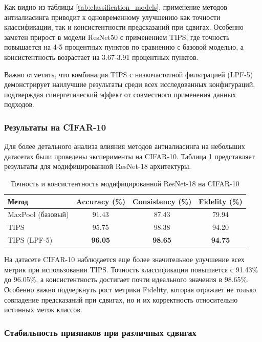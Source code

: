 Как видно из таблицы \ref{tab:classification_models}, применение методов антиалиасинга приводит к одновременному улучшению как точности классификации, так и консистентности предсказаний при сдвигах. Особенно заметен прирост в модели ResNet50 с применением TIPS, где точность повышается на 4-5 процентных пунктов по сравнению с базовой моделью, а консистентность возрастает на 3.67-3.91 процентных пунктов.

Важно отметить, что комбинация TIPS с низкочастотной фильтрацией (LPF-5) демонстрирует наилучшие результаты среди всех исследованных конфигураций, подтверждая синергетический эффект от совместного применения данных подходов.

\subsubsection{Результаты на CIFAR-10}

Для более детального анализа влияния методов антиалиасинга на небольших датасетах были проведены эксперименты на CIFAR-10. Таблица \ref{tab:cifar_results} представляет результаты для модифицированной ResNet-18 архитектуры.

\begin{table}[h]
\centering
\caption{Точность и консистентность модифицированной ResNet-18 на CIFAR-10}
\label{tab:cifar_results}
\begin{tabular}{lccc}
\toprule
\textbf{Метод} & \textbf{Accuracy (\%)} & \textbf{Consistency (\%)} & \textbf{Fidelity (\%)} \\
\midrule
MaxPool (базовый) & 91.43 & 87.43 & 79.94 \\
TIPS & 95.75 & 98.38 & 94.20 \\
TIPS (LPF-5) & \textbf{96.05} & \textbf{98.65} & \textbf{94.75} \\
\bottomrule
\end{tabular}
\end{table}

На датасете CIFAR-10 наблюдается еще более значительное улучшение всех метрик при использовании TIPS. Точность классификации повышается с 91.43\% до 96.05\%, а консистентность достигает почти идеального значения в 98.65\%. Особенно важно подчеркнуть рост метрики Fidelity, которая отражает не только совпадение предсказаний при сдвигах, но и их корректность относительно истинных меток классов.

\subsubsection{Стабильность признаков при различных сдвигах}

